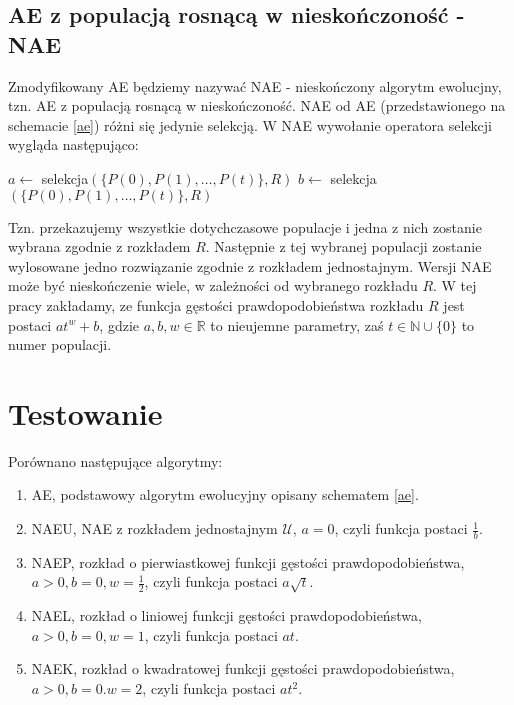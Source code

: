 \documentclass[12pt, a4paper]{article}
\begin{document}
\subsection{AE z populacją rosnącą w nieskończoność - NAE}

Zmodyfikowany AE będziemy nazywać NAE - nieskończony algorytm ewolucjny, tzn. AE z populacją rosnącą w nieskończoność.
NAE od AE (przedstawionego na schemacie \ref{ae}) różni się jedynie selekcją. W NAE wywołanie operatora selekcji wygląda następująco:

\begin{algorithm}[!htb]
\begin{algorithmic}[1] 
  \State $a \gets$ selekcja$(\{P(0), P(1), \dots, P(t)\}, R)$
  \State $b \gets$ selekcja$(\{P(0), P(1), \dots, P(t)\}, R)$
\end{algorithmic}
\end{algorithm}

Tzn. przekazujemy wszystkie dotychczasowe populacje i jedna z nich zostanie wybrana zgodnie z rozkładem $R$.
Następnie z tej wybranej populacji zostanie wylosowane jedno rozwiązanie zgodnie z rozkładem jednostajnym.
Wersji NAE może być nieskończenie wiele, w zależności od wybranego rozkładu $R$. 
W tej pracy zakładamy, ze funkcja gęstości prawdopodobieństwa rozkładu $R$ jest postaci $at^w + b$, gdzie
$a, b, w \in \mathbb{R}$ to nieujemne parametry, zaś $t \in \mathbb{N} \cup \{0\}$ to numer populacji. 

\section{Testowanie}

Porównano następujące algorytmy:

\begin{enumerate}
 \item AE, podstawowy algorytm ewolucyjny opisany schematem \ref{ae}.
 \item NAEU, NAE z rozkładem jednostajnym $\mathcal{U}$, $a=0$,
czyli funkcja postaci $\frac{1}{b}$. 
 \item NAEP, rozkład o pierwiastkowej funkcji gęstości prawdopodobieństwa, \\$a>0, b=0, w=\frac{1}{2}$,
czyli funkcja postaci $a\sqrt{t}$.
 \item NAEL, rozkład o liniowej funkcji gęstości prawdopodobieństwa, $a>0, b=0, w=1$,
czyli funkcja postaci $at$.
 \item NAEK, rozkład o kwadratowej funkcji gęstości prawdopodobieństwa, \\$a>0, b=0. w=2$,
czyli funkcja postaci $at^2$.
\end{enumerate}
\end{document}
